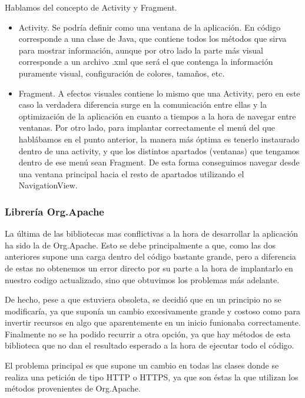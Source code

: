 Hablamos del concepto de Activity y Fragment.

\begin{itemize}
\item Activity. Se podría definir como una ventana de la aplicación. En código corresponde a una clase de Java, que contiene todos los métodos que sirva para mostrar información, aunque por otro lado la parte más visual corresponde a un archivo .xml que será el que contenga la información puramente visual, configuración de colores, tamaños, etc.
\item Fragment. A efectos visuales contiene lo mismo que una Activity, pero en este caso la verdadera diferencia surge en la comunicación entre ellas y la optimización de la aplicación en cuanto a tiempos a la hora de navegar entre ventanas. Por otro lado, para implantar correctamente el menú del que hablábamos en el punto anterior, la manera más óptima es tenerlo instaurado dentro de una activity, y que los distintos apartados (ventanas) que tengamos dentro de ese menú sean Fragment. De esta forma conseguimos navegar desde una ventana principal hacia el resto de apartados utilizando el NavigationView.
\end{itemize}

\subsubsection{Librería Org.Apache}

La última de las bibliotecas mas conflictivas a la hora de desarrollar la aplicación ha sido la de Org.Apache. Esto se debe principalmente a que, como las dos anteriores supone una carga dentro del código bastante grande, pero a diferencia de estas no obtenemos un error directo por su parte a la hora de implantarlo en nuestro codigo actualizado, sino que obtuvimos los problemas más adelante.

De hecho, pese a que estuviera obsoleta, se decidió que en un principio no se modificaría, ya que suponía un cambio excesivamente grande y costoso como para invertir recursos en algo que aparentemente en un inicio funionaba correctamente. Finalmente no se ha podido recurrir a otra opción, ya que hay métodos de esta biblioteca que no dan el resultado esperado a la hora de ejecutar todo el código.

El problema principal es que supone un cambio en todas las clases donde se realiza una petición de tipo HTTP o HTTPS, ya que son éstas la que utilizan los métodos provenientes de Org.Apache. 


